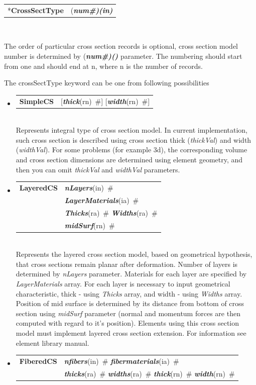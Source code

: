 \documentclass[a4paper]{article}
\makeatletter
\newcommand{\param}[1]{{\em #1}}
\newcommand{\fieldVal}[2]{\mbox{({\it\bf{#1}\#)\tiny (#2)}}}
\newcommand{\keywordnotype}[1]{\mbox{{\it{\bf{#1}}}}}
\newcommand{\keyword}[2]{\mbox{{\keywordnotype{#1}\tiny (#2)}}}
\newcommand{\entKeyword}[1]{\mbox{{*{\bf{#1}}}}}
\newcommand{\entKeywordInst}[1]{\mbox{{\bf{{#1}}}}}
\newcommand{\field}[2]{\mbox{\keyword{#1}{#2}~\#}}
\newcommand{\optField}[2]{\mbox{[\field{#1}{#2}]}}
\newenvironment{record}[1][]{\begin{tabular}{|ll}}{\end{tabular}\\}
\newcommand{\recentry}[2]{{#1}&{#2}\\}
\newcounter{rcc}
\newenvironment{record}[1][\textwidth]{\setcounter{rcc}{0}\begin{tabular*}{#1}{|ll@{\extracolsep{\fill}}r}}{\end{tabular*}\\}
\newcommand{\recentry}[2]{\ifthenelse{\value{rcc}>0}{&$\backslash$ \\}{\setcounter{rcc}{1}}{#1}&{#2}}
\makeatother
\begin{document}
\begin{record}[0.9\textwidth]
  \recentry{\entKeyword{CrossSectType}}{\fieldVal{num}{in}}
\end{record}

The order of particular cross section records is optional, cross section 
model number is determined by \fieldVal{num}{} parameter. 
The numbering should start from one and should end at n, where n is the number of records.

The crossSectType keyword can be one from following possibilities
\begin{itemize}
\item
  \begin{record}[0.9\textwidth]
  \recentry{\entKeywordInst{SimpleCS}}{\optField{thick}{rn} \optField{width}{rn}}
  \end{record}
Represents integral type of cross section model. In current
implementation, such cross section is described using cross section
thick (\param{thickVal}) and width (\param{widthVal}). For some
problems (for example 
3d), the corresponding volume and cross section dimensions are
determined using element geometry, and then you can omit \param{thickVal} and \param{widthVal}
parameters. 
\item 
  \begin{record}[0.9\textwidth]
    \recentry{\entKeywordInst{LayeredCS}}{\field{nLayers}{in}}
    \recentry{}{\field{LayerMaterials}{ia}} 
    \recentry{}{\field{Thicks}{ra} \field{Widths}{ra}}
    \recentry{}{\field{mid\-Surf}{rn}}
  \end{record}
Represents the layered cross section model, based on
geometrical hypothesis, that cross sections remain planar after
deformation. Number of layers is
determined by \param{nLayers} parameter. Materials for each
layer are specified by \param{LayerMaterials} array. For each layer is
necessary to input 
geometrical characteristic, thick - using \param{Thicks} array, and
width - using 
\param{Widths} array. Position of mid surface is determined by its
distance from 
bottom of cross section using \param{mid\-Surf} parameter (normal and
momentum forces are then computed with regard to it's position).
Elements using this cross section model must implement layered cross
section extension. For information see element library manual.
\item 
  \begin{record}[0.9\textwidth]
    \recentry{\entKeywordInst{FiberedCS}}{\field{nfibers}{in} \field{fibermaterials}{ia}}
    \recentry{}{\field{thicks}{ra} \field{widths}{ra} \field{thick}{rn} \field{width}{rn}}

\end{record}
\end{itemize}
\end{document}
